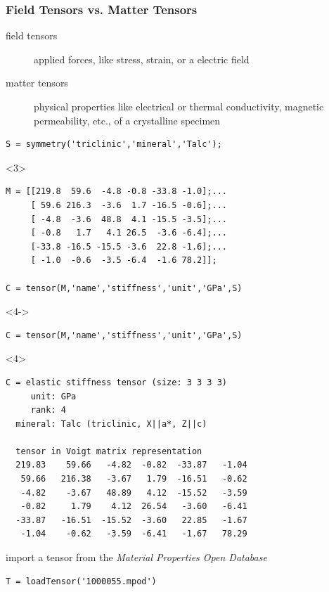 \begin{frame}[fragile]
  \frametitle{Field Tensors vs. Matter Tensors}

  \begin{description}
    \item[field tensors] applied forces, like stress, strain,
  or a electric field
  \item[matter tensors] physical properties like electrical or thermal conductivity,
  magnetic permeability, etc., of a crystalline specimen
  \end{description}

\pause
\medskip

\begin{lstlisting}
S = symmetry('triclinic','mineral','Talc');
\end{lstlisting}

\pause
\medskip

\begin{onlyenv}<3>
  \begin{lstlisting}
M = [[219.8  59.6  -4.8 -0.8 -33.8 -1.0];...
     [ 59.6 216.3  -3.6  1.7 -16.5 -0.6];...
     [ -4.8  -3.6  48.8  4.1 -15.5 -3.5];...
     [ -0.8   1.7   4.1 26.5  -3.6 -6.4];...
     [-33.8 -16.5 -15.5 -3.6  22.8 -1.6];...
     [ -1.0  -0.6  -3.5 -6.4  -1.6 78.2]];

C = tensor(M,'name','stiffness','unit','GPa',S)
  \end{lstlisting}
\end{onlyenv}
\begin{onlyenv}<4->
\begin{lstlisting}
C = tensor(M,'name','stiffness','unit','GPa',S)
\end{lstlisting}
\end{onlyenv}

\pause

\begin{onlyenv}<4>
\begin{lstlisting}[style=output]
C = elastic stiffness tensor (size: 3 3 3 3)
     unit: GPa
     rank: 4
  mineral: Talc (triclinic, X||a*, Z||c)

  tensor in Voigt matrix representation
  219.83    59.66   -4.82  -0.82  -33.87   -1.04
   59.66   216.38   -3.67   1.79  -16.51   -0.62
   -4.82    -3.67   48.89   4.12  -15.52   -3.59
   -0.82     1.79    4.12  26.54   -3.60   -6.41
  -33.87   -16.51  -15.52  -3.60   22.85   -1.67
   -1.04    -0.62   -3.59  -6.41   -1.67   78.29
\end{lstlisting}
\end{onlyenv}

\pause
\medskip

import a tensor from the \emph{Material Properties Open Database}

\begin{lstlisting}
T = loadTensor('1000055.mpod')
\end{lstlisting}

\end{frame}


